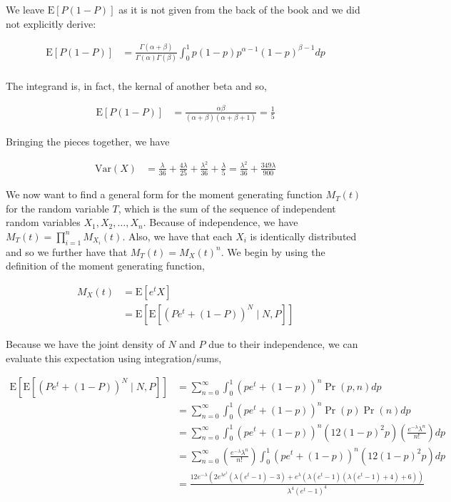 \documentclass[11pt]{article}
\begin{document}
We leave $\mathrm{E}[P(1-P)]$ as it is not given from the back of the
book and we did not explicitly derive:

\begin{align*}
  \mathrm{E}[P(1-P)] &= \frac{\Gamma(\alpha + \beta)}{\Gamma(\alpha)
                       \Gamma(\beta)} \int_0^1 p(1-p)
                       p^{\alpha-1}(1-p)^{\beta-1} dp \\
\end{align*}

The integrand is, in fact, the kernal of another beta and so,

\begin{align*}
  \mathrm{E}[P(1-P)] &= \frac{\alpha \beta}{(\alpha + \beta)(\alpha +
                       \beta + 1)} = \frac{1}{5}
\end{align*}

Bringing the pieces together, we have

\begin{align*}
  \mathrm{Var}(X) &= \frac{\lambda}{36} + \frac{4 \lambda}{25} +
                    \frac{\lambda^2}{36} + \frac{\lambda}{5} =
                    \frac{\lambda^2}{36} + \frac{349\lambda}{900}
\end{align*}

We now want to find a general form for the moment generating function
$M_T(t)$ for the random variable $T$, which is the sum of the sequence
of independent random variables $X_1, X_2, \dots, X_n$.  Because of
independence, we have $M_T(t) = \prod_{i=1}^n M_{X_i}(t)$.  Also, we
have that each $X_i$ is identically distributed and so we further have
that $M_T(t) = M_X(t)^n$.  We begin by using the definition of the
moment generating function,

\begin{align*}
  M_X(t) &= \mathrm{E}[e^tX] \\
  &= \mathrm{E}[\mathrm{E}[(Pe^t + (1-P))^N \mid N,P]]
\end{align*}

Because we have the joint density of $N$ and $P$ due to their
independence, we can evaluate this expectation using integration/sums,

\begin{align*}
  \mathrm{E}[\mathrm{E}[(Pe^t + (1-P))^N \mid N,P]] &=
  \sum_{n=0}^{\infty} \int_0^1 (pe^t+(1-p))^n
  \Pr{(p,n)} dp \\
  &= \sum_{n=0}^{\infty} \int_0^1 (pe^t+(1-p))^n \Pr{(p)} \Pr{(n)} dp \\
  &= \sum_{n=0}^{\infty} \int_0^1 (pe^t+(1-p))^n \left( 12(1-p)^2 p
  \right) \left(
    \frac{e^{-\lambda} \lambda^n}{n!} \right) dp \\
  &= \sum_{n=0}^{\infty} \left( \frac{e^{-\lambda} \lambda^n}{n!}
  \right)
  \int_0^1 (pe^t+(1-p))^n \left( 12(1-p)^2 p \right)  dp \\
  &= \frac{12 e^{-\lambda } \left(2 e^{\lambda e^t} \left(\lambda
        \left(e^t-1\right)-3\right)+e^{\lambda } \left(\lambda
        \left(e^t-1\right) \left(\lambda
          \left(e^t-1\right)+4\right)+6\right)\right)}{\lambda^4
    \left(e^t-1\right)^4}
\end{align*}
\end{document}

